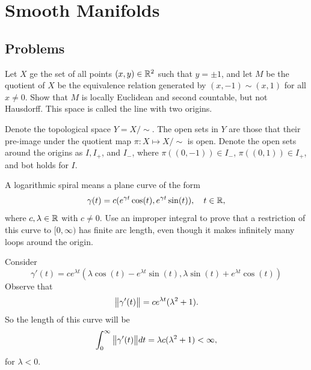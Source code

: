 \chapter{Smooth Manifolds}


\section{Problems}
\begin{problem}
	Let $ X $ ge the set of all points $ (x,y) \in \mathbb{R}^2 $ such that $ y = \pm 1 $, and let $ M $ be the quotient of $ X $ be the equivalence relation generated by $ (x,-1) \sim (x,1) $ for all $ x\neq 0 $. Show that $ M $ is locally Euclidean and second countable, but not Hausdorff. This space is called the line with two origins.
\end{problem}

\begin{solution}
	Denote the topological space $ Y = X/\sim $. The open sets in $ Y $ are those that their pre-image under the quotient map $ \pi: X \mapsto X/\sim $ is open. Denote the open sets around the origins as $ I, I_+ $, and $ I_- $, where $ \pi((0,-1)) \in I_- $, $ \pi((0,1))\in I_+ $, and bot holds for $ I $.
\end{solution}



\begin{problem}[Exercise 1.3]
	A logarithmic spiral means a plane curve of the form
	\[ \gamma(t) = c(e^{\gamma t} \cos(t),e^{\gamma t}\sin(t)), \quad t\in\mathbb{R}, \]
	where $ c,\lambda \in \mathbb{R} $ with $ c\neq 0 $. Use an improper integral to prove that a restriction of this curve to $ [0,\infty) $ has finite arc length, even though it makes infinitely many loops around the origin.
\end{problem}
\begin{solution}
	Consider
	\[ \gamma'(t) = ce^{\lambda t} (\lambda\cos(t) - e^{\lambda t}\sin(t), \lambda\sin(t) + e^{\lambda t}\cos(t)) \]
	Observe that
	\[ \norm{\gamma'(t)} = ce^{\lambda t}(\lambda^2+1). \]
	So the length of this curve will be
	\[ \int_0^\infty \norm{\gamma'(t)}dt = \lambda c (\lambda^2 + 1) < \infty, \]
	for $ \lambda < 0 $.
\end{solution}



